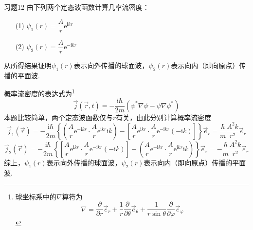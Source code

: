 \begin{question}{习题12}
    由下列两个定态波函数计算几率流密度：
    \begin{enumerate}
        \item[(1)] $\psi_1(r)=\dfrac{A}{r}\mathrm{e}^{\mathrm{i}kr}$
        \item[(2)] $\psi_2(r)=\dfrac{A}{r}\mathrm{e}^{-\mathrm{i}kr}$
    \end{enumerate}
    从所得结果证明$\psi_1(r)$表示向外传播的球面波，$\psi_2(r)$表示向内（即向原点）传播的平面波.
\end{question}
\begin{solution}
    概率流密度的表达式为\footnote{球坐标系中的$\nabla$算符为$$\nabla=\frac{\partial }{\partial r}\vec{e}_r + \frac{1}{r}\frac{\partial }{\partial \theta}\vec{e}_{\theta} + \frac{1}{r\sin\theta}\frac{\partial }{\partial \varphi}\vec{e}_{\varphi}$$}
    \begin{equation}\label{概率流密度}
        \vec{j}(\vec{r}, t) = -\frac{\mathrm{i}\hbar}{2m}\left(\psi^*\nabla\psi-\psi\nabla\psi^*\right)
    \end{equation}
    本题比较简单，两个定态波函数仅与$r$有关，由此分别计算概率流密度
    $$
        \vec{j}_1(\vec{r}) = -\frac{\mathrm{i}\hbar}{2m}\left\{\left(\frac{A}{r}\mathrm{e}^{-\mathrm{i}kr}\cdot\frac{A}{r}\mathrm{e}^{\mathrm{i}kr}\mathrm{i}k\right) - \left[\frac{A}{r}\mathrm{e}^{\mathrm{i}kr}\cdot\frac{A}{r}\mathrm{e}^{-\mathrm{i}kr}(-\mathrm{i}k)\right]\right\}\vec{e}_r
        =\frac{\hbar}{m}\frac{A^2k}{r^2}\vec{e}_r
    $$
    $$
        \vec{j}_2(\vec{r}) = -\frac{\mathrm{i}\hbar}{2m}\left\{\left[\frac{A}{r}\mathrm{e}^{\mathrm{i}kr}\cdot\frac{A}{r}\mathrm{e}^{-\mathrm{i}kr}(-\mathrm{i}k)\right]-\left(\frac{A}{r}\mathrm{e}^{-\mathrm{i}kr}\cdot\frac{A}{r}\mathrm{e}^{\mathrm{i}kr}\mathrm{i}k\right)\right\}\vec{e}_r
        =-\frac{\hbar}{m}\frac{A^2k}{r^2}\vec{e}_r
    $$
    综上，$\psi_1(r)$表示向外传播的球面波，$\psi_2(r)$表示向内（即向原点）传播的平面波.
\end{solution}
